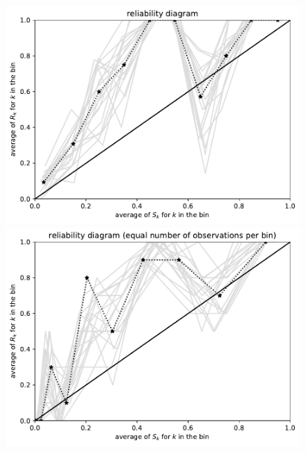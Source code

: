 \documentclass{article}
\begin{document}
\begin{figure}
\begin{centering}
\parbox{\imsize}{\includegraphics[width=\imsize]
                {./codes/unweighted/100_10_1_2/equiprob.pdf}}
\quad\quad
\parbox{\imsize}{\includegraphics[width=\imsize]
                {./codes/unweighted/100_10_1_2/equisamp.pdf}}

\vspace{\vertsep}


\end{centering}
\end{figure}
\end{document}

